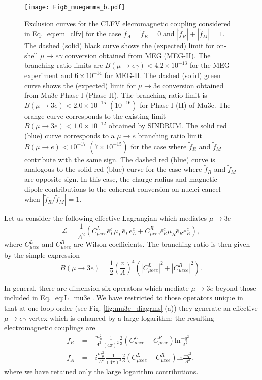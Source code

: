 \documentclass{book}[12pt]
\begin{document}
\begin{figure}
\centering
\texttt{[image: Fig6\_muegamma\_b.pdf]}
\caption{Exclusion curves for the CLFV elecromagnetic coupling considered in Eq. \ref{eq:em_clfv} for the case $\tilde{f}_A=\tilde{f}_E=0$ and $|\tilde{f}_R|+|\tilde{f}_M|=1$. The dashed (solid) black curve shows the (expected) limit for on-shell $\mu\rightarrow e\gamma$ conversion obtained from MEG (MEG-II). The branching ratio limits are $B(\mu\rightarrow e\gamma)<4.2\times 10^{-13}$ for the MEG experiment and $6\times 10^{-14}$ for MEG-II. The dashed (solid) green curve shows the (expected) limit for $\mu\rightarrow 3e$ conversion obtained from Mu3e Phase-I (Phase-II). The branching ratio limit is $B(\mu\rightarrow 3e)<2.0\times 10^{-15}$ $(10^{-16})$ for Phase-I (II)  of Mu3e. The orange curve corresponds to the existing limit $B(\mu\rightarrow 3e)<1.0\times 10^{-12}$ obtained by SINDRUM. The solid red (blue) curve corresponds to a $\mu\rightarrow e$ branching ratio limit $B(\mu\rightarrow e)<10^{-17}$ $(7\times 10^{-15})$ for the case where $\tilde{f}_R$ and $\tilde{f}_M$ contribute with the same sign. The dashed red (blue) curve is analogous to the solid red (blue) curve for the case where $\tilde{f}_R$ and $\tilde{f}_M$ are opposite sign. In this case, the charge radius and magnetic dipole contributions to the coherent conversion on nuclei cancel when $|\tilde{f}_R/\tilde{f}_M|=1$.}
\label{fig:mu2e_meg_mu3e}
\end{figure}

Let us consider the following effective Lagrangian which mediates $\mu\rightarrow 3e$
\begin{equation}
\mathcal{L}=\frac{1}{\Lambda^2}\left(C_{\mu eee}^L\bar{e}^c_L\mu_L\bar{e}_Le^c_L+C^R_{\mu eee}\bar{e}^c_R\mu_R\bar{e}_Re^c_R\right),
\label{eq:L_mu3e}
\end{equation}
where $C^L_{\mu eee}$ and $C^R_{\mu eee}$ are Wilson coefficients. The branching ratio is then given by the simple expression
\begin{equation}
B(\mu\rightarrow 3e)=\frac{1}{2}\left(\frac{v}{\Lambda}\right)^4\left(|C^L_{\mu eee}|^2+|C^R_{\mu eee}|^2\right).
\end{equation}

In general, there are dimension-six operators which mediate $\mu\rightarrow 3e$ beyond those included in Eq. \ref{eq:L_mu3e}. We have restricted to those operators unique in that at one-loop order (see Fig. \ref{fig:mu3e_diagrms} (a)) they generate an effective $\mu\rightarrow e\gamma$ vertex which is enhanced by a large logarithm; the resulting electromagnetic couplings are \cite{Raidal:1997hq,Cirigliano:2004mv,PhysRevLett.93.231802}
\begin{equation}
\begin{split}
f_R&=-\frac{m_{\mu}^2}{\Lambda^2}\frac{1}{(4\pi)^2}\frac{2}{3}\left(C^L_{\mu eee}+C^R_{\mu eee}\right)\mathrm{ln}\frac{-q^2}{\Lambda^2}\\
f_A&=-i\frac{m_{\mu}^2}{\Lambda^2}\frac{1}{(4\pi)^2}\frac{2}{3}\left(C^L_{\mu eee}-C^R_{\mu eee}\right)\mathrm{ln}\frac{-q^2}{\Lambda^2},
\end{split}
\end{equation}
where we have retained only the large logarithm contributions.
\end{document}
